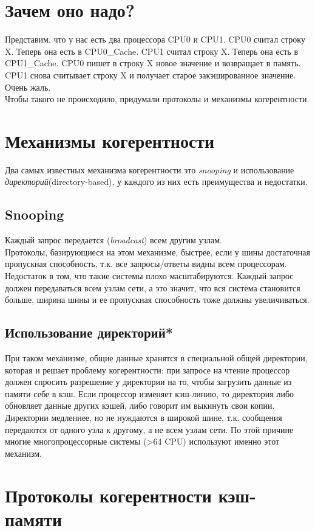 \documentclass[12pt, a4paper]{article}
\begin{document}
\section{Зачем оно надо?}
Представим, что у нас есть два процессора CPU0 и CPU1. CPU0 считал строку X. Теперь она есть в CPU0\_Cache. CPU1 считал строку X. Теперь она есть в CPU1\_Cache. CPU0 пишет в строку X новое значение и возвращает в память. CPU1 снова считывает строку X и получает старое закэшированное значение. Очень жаль.\\
Чтобы такого не происходило, придумали протоколы и механизмы когерентности.
\section{Механизмы когерентности}
Два самых известных механизма когерентности это \textit{snooping} и использование \textit{директорий}(directory-based), у каждого из них есть преимущества и недостатки.
\subsection{Snooping}
Каждый запрос передается (\textit{broadcast}) всем другим узлам.\\
Протоколы, базирующиеся на этом механизме, быстрее, если у шины достаточная пропускная способность, т.к. все запросы/ответы видны всем процессорам. Недостаток в том, что такие системы плохо масштабируются. Каждый запрос должен передаваться всем узлам сети, а это значит, что вся система становится больше, ширина шины и ее пропускная способность тоже должны увеличиваться.
\subsection{Использование директорий*}
При таком механизме, общие данные хранятся в специальной общей директории, которая и решает проблему когерентности: при запросе на чтение процессор должен спросить разрешение у директории на то, чтобы загрузить данные из памяти себе в кэш. Если процессор изменяет кэш-линию, то директория либо обновляет данные других кэшей, либо говорит им выкинуть свои копии.
Директории медленнее, но не нуждаются в широкой шине, т.к. сообщения передаются от одного узла к другому, а не всем узлам сети. По этой причине многие многопроцессорные системы (>64 CPU) используют именно этот механизм.
\section{Протоколы когерентности кэш-памяти}
\end{document}
